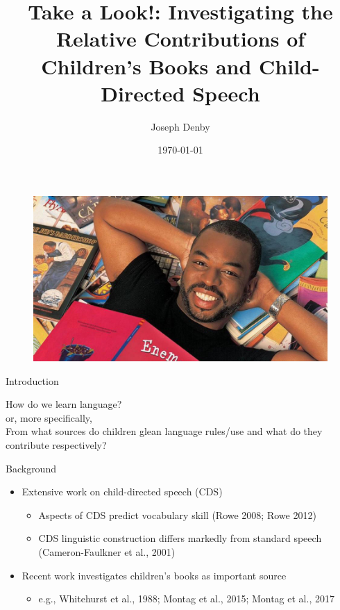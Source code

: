 \documentclass{beamer}
\title[Take a Look!]{Take a Look!: Investigating the Relative Contributions of Children's Books and Child-Directed Speech} %
\author{Joseph Denby} %
\institute[] %
{
	Perspectives on Computational Research \\ %
	\medskip
}
\date{\today} %
\begin{document}
	
	\begin{frame}
		\titlepage %
		\begin{figure}
			\includegraphics[width=.4\linewidth]{readrainbow.jpg}
		\end{figure}
	\end{frame}
	

\begin{frame}{Introduction}
	\begin{center}
		\Huge How do we learn language? \\
		\vspace{3mm}
		\small or, more specifically, \\
		\vspace{3mm}
		\Large From what sources do children glean language rules/use and what do they contribute respectively?
	\end{center}
\end{frame}


\begin{frame}{Background}
	\begin{itemize}
		\item Extensive work on child-directed speech (CDS)
		\begin{itemize}
			\item Aspects of CDS predict vocabulary skill (Rowe 2008; Rowe 2012)
			\item CDS linguistic construction differs markedly from standard speech (Cameron-Faulkner et al., 2001)
		\end{itemize}
		\item Recent work investigates children's books as important source
		\begin{itemize}
			\item e.g., Whitehurst et al., 1988; Montag et al., 2015; Montag et al., 2017
		\end{itemize}

	\end{itemize}
\end{frame}
\end{document}

